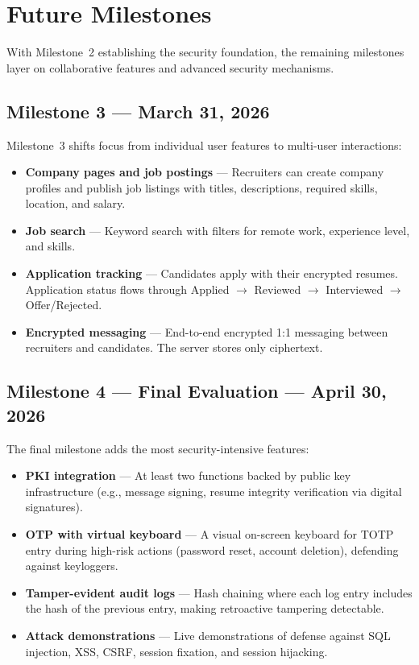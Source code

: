 
\section{Future Milestones}
\label{sec:roadmap}

With Milestone~2 establishing the security foundation, the remaining milestones layer on collaborative features and advanced security mechanisms.

\subsection{Milestone 3 — March 31, 2026}

Milestone~3 shifts focus from individual user features to multi-user interactions:

\begin{itemize}
    \item \textbf{Company pages and job postings} — Recruiters can create company profiles and publish job listings with titles, descriptions, required skills, location, and salary.
    \item \textbf{Job search} — Keyword search with filters for remote work, experience level, and skills.
    \item \textbf{Application tracking} — Candidates apply with their encrypted resumes. Application status flows through Applied $\rightarrow$ Reviewed $\rightarrow$ Interviewed $\rightarrow$ Offer/Rejected.
    \item \textbf{Encrypted messaging} — End-to-end encrypted 1:1 messaging between recruiters and candidates. The server stores only ciphertext.
\end{itemize}

\subsection{Milestone 4 — Final Evaluation — April 30, 2026}

The final milestone adds the most security-intensive features:

\begin{itemize}
    \item \textbf{PKI integration} — At least two functions backed by public key infrastructure (e.g., message signing, resume integrity verification via digital signatures).
    \item \textbf{OTP with virtual keyboard} — A visual on-screen keyboard for TOTP entry during high-risk actions (password reset, account deletion), defending against keyloggers.
    \item \textbf{Tamper-evident audit logs} — Hash chaining where each log entry includes the hash of the previous entry, making retroactive tampering detectable.
    \item \textbf{Attack demonstrations} — Live demonstrations of defense against SQL injection, XSS, CSRF, session fixation, and session hijacking.
\end{itemize}

